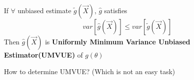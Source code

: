     If $\forall$ unbiased estimate $\tilde{g}(\vec{X})$, $\hat{g}$ satisfies
        \begin{equation}
            var[\hat{g}(\vec{X})]\leq var[\tilde{g}(\vec{X})]    
        \end{equation}
        Then $\hat{g}(\vec{X})$ is \textbf{Uniformly Minimum Variance Unbiased Estimator(UMVUE)} of $g(\theta)$

\begin{point}
    How to determine UMVUE? (Which is not an easy task)
\end{point}

